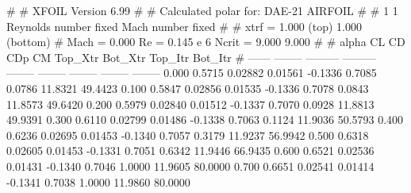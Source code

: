 #  
#       XFOIL         Version 6.99
#  
# Calculated polar for: DAE-21 AIRFOIL                                  
#  
# 1 1 Reynolds number fixed          Mach number fixed         
#  
# xtrf =   1.000 (top)        1.000 (bottom)  
# Mach =   0.000     Re =     0.145 e 6     Ncrit =   9.000  9.000
#  
#   alpha    CL        CD       CDp       CM     Top_Xtr  Bot_Xtr  Top_Itr  Bot_Itr
#  ------ -------- --------- --------- -------- -------- -------- -------- --------
   0.000   0.5715   0.02882   0.01561  -0.1336   0.7085   0.0786  11.8321  49.4423
   0.100   0.5847   0.02856   0.01535  -0.1336   0.7078   0.0843  11.8573  49.6420
   0.200   0.5979   0.02840   0.01512  -0.1337   0.7070   0.0928  11.8813  49.9391
   0.300   0.6110   0.02799   0.01486  -0.1338   0.7063   0.1124  11.9036  50.5793
   0.400   0.6236   0.02695   0.01453  -0.1340   0.7057   0.3179  11.9237  56.9942
   0.500   0.6318   0.02605   0.01453  -0.1331   0.7051   0.6342  11.9446  66.9435
   0.600   0.6521   0.02536   0.01431  -0.1340   0.7046   1.0000  11.9605  80.0000
   0.700   0.6651   0.02541   0.01414  -0.1341   0.7038   1.0000  11.9860  80.0000
